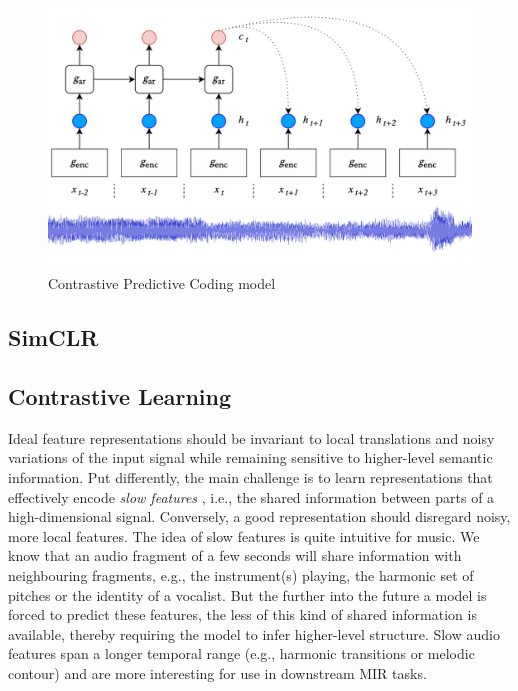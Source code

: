 \documentclass{report}
\begin{document}
\begin{figure}[t]
    \centering
    \includegraphics[width=.75\columnwidth]{figs/cpc_model.png}
    \caption{Contrastive Predictive Coding model}
    \label{fig:cpc_model}
\end{figure}

\subsection{SimCLR}

\subsection{Contrastive Learning}
Ideal feature representations should be invariant to local translations and noisy variations of the input signal while remaining sensitive to higher-level semantic information. Put differently, the main challenge is to learn representations that effectively encode \textit{slow features} \cite{wiskott_slow_2002}, i.e., the shared information between parts of a high-dimensional signal. Conversely, a good representation should disregard noisy, more local features. The idea of slow features is quite intuitive for music.
We know that an audio fragment of a few seconds will share information with neighbouring fragments, e.g., the instrument(s) playing, the harmonic set of pitches or the identity of a vocalist.  But the further into the future a model is forced to predict these features, the less of this kind of shared information is available, thereby requiring the model to infer higher-level structure. Slow audio features span a longer temporal range (e.g., harmonic transitions or melodic contour) and are more interesting for use in downstream MIR tasks.
\end{document}
